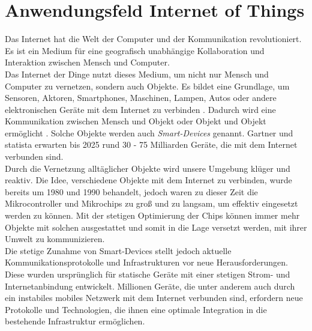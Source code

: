 \section{Anwendungsfeld Internet of Things} \label{s:domain}
Das Internet hat die Welt der Computer und der Kommunikation revolutioniert. Es ist ein Medium für eine geografisch unabhängige Kollaboration und Interaktion zwischen Mensch und Computer.
\cite{BriefHistoryInternet}
\\
Das Internet der Dinge nutzt dieses Medium, um nicht nur Mensch und Computer zu vernetzen, sondern auch Objekte.
Es bildet eine Grundlage, um Sensoren, Aktoren, Smartphones, Maschinen, Lampen, Autos oder andere elektronischen Geräte mit dem Internet zu verbinden \cite{kranenburgInternetThingsCritique2008}.
Dadurch wird eine Kommunikation zwischen Mensch und Objekt oder Objekt und Objekt ermöglicht \cite[S.~2]{uckelmannArchitectingInternetThings2011}.
Solche Objekte werden auch \textit{Smart-Devices} genannt.
Gartner \cite{hungGartnerInsightsHow} und statista \cite{GlobalIoTNonIoT} erwarten bis 2025 rund 30 - 75 Milliarden Geräte, die mit dem Internet verbunden sind.
\\
Durch die Vernetzung alltäglicher Objekte wird unsere Umgebung klüger und reaktiv.
Die Idee, verschiedene Objekte mit dem Internet zu verbinden, wurde bereits um 1980 und 1990 behandelt, jedoch waren zu dieser Zeit die Mikrocontroller und Mikrochips zu gro{\ss} und zu langsam, um effektiv eingesetzt werden zu können.
Mit der stetigen Optimierung der Chips können immer mehr Objekte mit solchen ausgestattet und somit in die Lage versetzt werden, mit ihrer Umwelt zu kommunizieren.
\cite{rangerWhatIoTEverything}
\\
Die stetige Zunahme von Smart-Devices stellt jedoch aktuelle Kommunikationsprotokolle und Infrastrukturen vor neue Herausforderungen.
Diese wurden ursprünglich für statische Geräte mit einer stetigen Strom- und Internetanbindung entwickelt. Millionen Geräte, die unter anderem auch durch ein instabiles mobiles Netzwerk mit dem Internet verbunden sind, erfordern neue Protokolle und Technologien, die ihnen eine optimale Integration in die bestehende Infrastruktur ermöglichen.
\cite[S.~7f]{uckelmannArchitectingInternetThings2011}
\newpage
